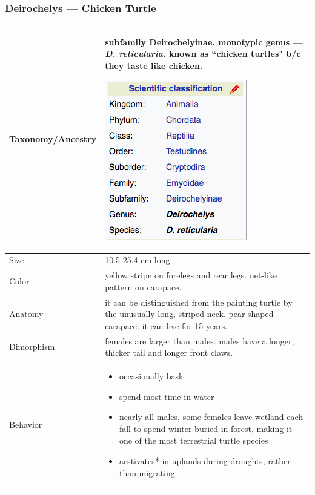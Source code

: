 \subsubsection{Deirochelys --- Chicken Turtle}
\begin{center}
\begin{longtabu} to 

	\hline
	Taxonomy/Ancestry &
	subfamily Deirochelyinae. monotypic genus --- \emph{D. reticularia}. known as ``chicken turtles" b/c they taste like chicken.
	
	\begin{center} \includegraphics[scale=0.5]{testudines/emydidae/deirochelys/tax} \end{center}
	 \\
	\hline
	Size & 
	10.5-25.4 cm long
	\\
	\hline
	Color &
	yellow stripe on forelegs and rear legs. net-like pattern on carapace.
	 \\
	\hline
	Anatomy &
	it can be distinguished from the painting turtle by the unusually long, striped neck. pear-shaped carapace. it can live for 15 years.
	 \\
	\hline
	Dimorphism & 
	females are larger than males. males have a longer, thicker tail and longer front claws.
	\\
	\hline
	Behavior & 
	\begin{itemize}[noitemsep]
		\item occasionally bask
		\item spend most time in water
		\item nearly all males, some females leave wetland each fall to spend winter buried in forest, making it one of the most terrestrial turtle species
		\item aestivates* in uplands during droughts, rather than migrating 
	\end{itemize}

\end{longtabu}
\end{center}
